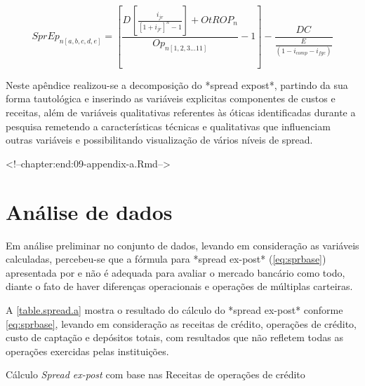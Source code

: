 \documentclass[
  12pt,
  12pt,
  openright,
  oneside,
  a4paper,
  chapter=TITLE,
  section=TITLE,
  subsection=TITLE,
  subsubsection=TITLE,
  english,
  portugues,
  sumario=tradicional]{abntex2}
\begin{document}
\begin{apendicesenv}
\begin{equation}\label{eq:oper02}
SprEp_{n[a,b,c,d,e]} =  [\frac{D_{}[\frac{   i_{jr}  }{  [1 + i_{jr}]^n -1  }] + OtROP_{n}}{Op_{n[1,2,3...11]}} -1] - \frac{DC_{}}{\frac{E_{}}{(1 - i_{comp} - i_{fgc})}}
\end{equation}


Neste apêndice realizou-se a decomposição do *spread expost*, partindo da sua forma tautológica e inserindo as variáveis explicitas componentes de custos e receitas, além de variáveis qualitativas referentes às óticas identificadas durante a pesquisa remetendo a características técnicas e qualitativas que influenciam outras variáveis e possibilitando visualização de vários níveis de spread. 


<!--chapter:end:09-appendix-a.Rmd-->

\chapter{Análise de dados}\label{apendiceb}

Em análise preliminar no conjunto de dados, levando em consideração as variáveis calculadas, percebeu-se que a fórmula para *spread ex-post* (\autoref{eq:sprbase}) apresentada por \textcite{dantas:2012} e \textcite{timotio:2018} não é adequada para avaliar o mercado bancário como todo, diante o fato de haver diferenças operacionais e operações de múltiplas carteiras. 

A \autoref{table.spread.a} mostra o resultado do cálculo do *spread ex-post* conforme \autoref{eq:sprbase}, levando em consideração as receitas de crédito, operações de crédito, custo de captação e depósitos totais, com resultados que não refletem todas as operações exercidas pelas instituições.

\begin{table}
\caption{Cálculo \emph{Spread ex-post} com base nas Receitas de operações de crédito}
\vspace{1mm}
\begingroup\fontsize{10}{12}\selectfont


\end{table}
\end{apendicesenv}
\end{document}

